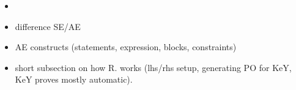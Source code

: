 \begin{itemize}
\item {}
\item difference SE/AE
\item AE constructs (statements, expression, blocks, constraints)
\item short subsection on how R. works (lhs/rhs setup, generating PO
  for KeY, KeY proves mostly automatic).
\end{itemize}

